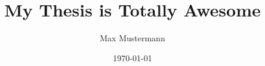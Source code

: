 \documentclass[abstracton,twoside,notitlepage]{scrreprt}
\title{My Thesis is Totally Awesome}
\author{Max Mustermann}
\date{\today}
\begin{document}
	
	\cleardoublepage
	
	\begin{otherlanguage}{ngerman}
		
	\end{otherlanguage}
	\cleardoublepage
	\tableofcontents
	\cleardoublepage
	
	
	
	
	
	\cleardoublepage
	
	
	\begin{otherlanguage}{ngerman}
		\cleardoublepage
		
	\end{otherlanguage}
\end{document}
